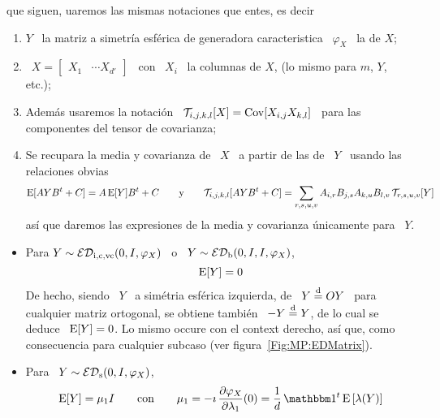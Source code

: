 \begin{itemize}
  que siguen, uaremos las mismas notaciones que entes, es decir
 \begin{enumerate}
 \item $Y$  \ la matriz a  simetr\'ia esf\'erica de  generadora caracteristica \
   $\varphi_X$ \ la de $X$;
 \item \ $X = \begin{bmatrix} X_1  & \cdots X_{d'} \end{bmatrix}$ \ con \ $X_i$
   \ la columnas de $X$, (lo mismo para $m$, $Y$, etc.);
 \item Adem\'as usaremos la  notaci\'on  \  $\mathcal{T}_{i,j,k,l}[X] =  \operatorname{Cov}[  X_{i,j}
   X_{k,l}]$ \ para las componentes del tensor de covarianza;
 \item\label{Enum:MP:RelacionesObvias} Se  recupara la  media y covarianza  de \
   $X$ \ a partir de las de \ $Y$ \ usando las relaciones obvias
 \[
 \operatorname{E}[ A Y B^t + C] = A  \operatorname{E}[Y] B^t + C \qquad \mbox{y} \qquad \mathcal{T}_{i,j,k,l}[ A
 Y B^t + C] = \sum_{r,s,u,v} A_{i,r} B_{j,s} A_{k,u} B_{l,v} \, \mathcal{T}_{r,s,u,v}[Y]
 \]
 as\'i que daremos las expresiones de  la media y covarianza \'unicamente para \
 $Y$.
  \end{enumerate}
  \begin{itemize}
  \item  Para  $Y  \sim  \mathcal{ED}_{\mathrm{i},\mathrm{c},\mathrm{vc}}(0,I,\varphi_X)$  \ o  \  $Y  \sim
    \mathcal{ED}_{\mathrm{b}}(0,I,I,\varphi_X)$,
    \[
    \Esp[Y] = 0 %
    \]
    \newline De hecho, siendo \ $Y$ \ a sim\'etria esf\'erica izquierda, de \ $Y
    \stackrel{\mathrm{d}}{=} O Y$  \ para cualquier matriz ortogonal, se obtiene  tambi\'en \ $- Y
    \stackrel{\mathrm{d}}{=} Y$,  de lo cual  se deduce \  $\operatorname{E}[Y] = 0$.  Lo mismo occure  con el
    context derecho,  as\'i que, como  consecuencia para cualquier  subcaso (ver
    figura~\ref{Fig:MP:EDMatrix}).
  \item Para \ $Y \sim
    \mathcal{ED}_{\mathrm{s}}(0,I,\varphi_X)$, %
    \[
    \Esp[Y] = \mu_1 I \qquad  \mbox{con} \qquad  \mu_1 = -  \imath \,
    \frac{\partial  \varphi_X}{\partial  \lambda_1}(0)  = \frac{1}{d}  \,  \un^t
    \Esp\left[ \lambda(Y) \right]
\]
\end{itemize}
\end{itemize}
